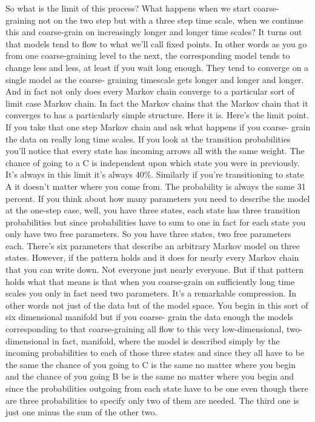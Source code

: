 \documentclass[]{article}
\begin{document}
So what is the limit of this process?
What happens when we start coarse-
graining not on the two step but with a
three step time scale, when we continue
this and coarse-grain on increasingly
longer and longer time scales? It turns
out that models tend to flow to what
we'll call fixed points. In other words
as you go from one coarse-graining level
to the next, the corresponding model
tends to change less and less, at least
if you wait long enough. They tend to
converge on a single model as the coarse-
graining timescale gets longer and
longer and longer. And in fact not only
does every Markov chain converge to a
particular sort of limit case
Markov chain. In fact the Markov chains
that the Markov chain that it
converges to has a particularly simple
structure. Here it is. Here's the limit
point. If you take that one step Markov
chain and ask what happens if you coarse-
grain the data on really long time
scales. If you look at the transition
probabilities
you'll notice that every state has
incoming arrows all with the same weight.
The chance of going to a C is
independent upon which state you were in
previously. It's always in this limit
it's always 40\%. Similarly if
you're transitioning to state A it
doesn't matter where you come from. The
probability is always the same
31 percent. If you think about how many
parameters you need to describe the
model at the one-step case, well, you have
three states, each state has three
transition probabilities but since
probabilities have to sum to one in fact
for each state you only have two free
parameters. So you have three states, two
free parameters each. There's six
parameters that describe an arbitrary
Markov model on three states. However, if
the pattern holds and it does for nearly
every Markov chain that you can write
down. Not everyone just nearly everyone.
But if that pattern holds what that
means is that when you coarse-grain on
sufficiently long time scales you only
in fact need two parameters. It's a
remarkable compression. In other words
not just of the data but of the model
space. You begin in this sort of six
dimensional manifold but if you coarse-
grain the data enough the models
corresponding to that coarse-graining all
flow to this very low-dimensional, two-
dimensional in fact, manifold,
where the model is described simply by
the incoming probabilities to each of
those three states and since they all
have to be the same the chance of you
going to C is the same no matter where
you begin and the chance of you going B
be is the same no matter where you begin
and since the probabilities outgoing
from each state have to be one even
though there are three probabilities to
specify only two of them are needed. The
third one is just one minus
the sum of the other two.
\end{document}
